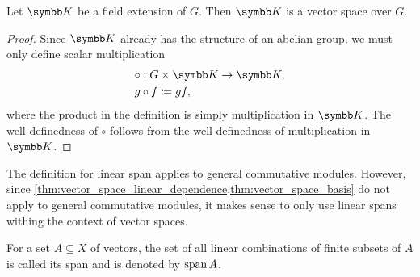 \begin{proposition}\label{thm:field_extension_is_vector_space}
  Let \( \K \) be a field extension of \( G \). Then \( \K \) is a vector space over \( G \).
\end{proposition}
\begin{proof}
  Since \( \K \) already has the structure of an abelian group, we must only define scalar multiplication
  \begin{align*}
    &\circ: G \times \K \to \K, \\
    &g \circ f \coloneqq gf,
  \end{align*}
  where the product in the definition is simply multiplication in \( \K \). The well-definedness of \( \circ \) follows from the well-definedness of multiplication in \( \K \).
\end{proof}

\begin{remark}\label{remark:linear_span_only_for_vector_spaces}
  The definition for linear span applies to general commutative modules. However, since \cref{thm:vector_space_linear_dependence,thm:vector_space_basis} do not apply to general commutative modules, it makes sense to only use linear spans withing the context of vector spaces.
\end{remark}

\begin{definition}\label{def:linear_span}
  For a set \( A \subseteq X \) of vectors, the set of all linear combinations of finite subsets of \( A \) is called its span and is denoted by \( \operatorname{span}{A} \).
\end{definition}


